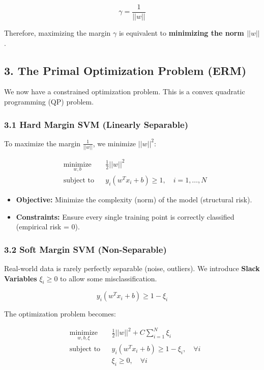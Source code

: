 \documentclass[
  italian,
  11pt,
]{article}
\begin{document}
\[\gamma = \frac{1}{||w||}\]

Therefore, maximizing the margin \(\gamma\) is equivalent to
\textbf{minimizing the norm \(||w||\)}.

\subsection{3. The Primal Optimization Problem
(ERM)}\label{the-primal-optimization-problem-erm}

We now have a constrained optimization problem. This is a convex
quadratic programming (QP) problem.

\subsubsection{3.1 Hard Margin SVM (Linearly
Separable)}\label{hard-margin-svm-linearly-separable}

To maximize the margin \(\frac{1}{||w||}\), we minimize \(||w||^2\):

\[\begin{aligned} & \underset{w, b}{\text{minimize}} & & \frac{1}{2} ||w||^2 \\ & \text{subject to} & & y_i (w^T x_i + b) \geq 1, \quad i = 1, \dots, N \end{aligned}\]

\begin{itemize}
\item
  \textbf{Objective:} Minimize the complexity (norm) of the model
  (structural risk).
\item
  \textbf{Constraints:} Ensure every single training point is correctly
  classified (empirical risk = 0).
\end{itemize}

\subsubsection{3.2 Soft Margin SVM
(Non-Separable)}\label{soft-margin-svm-non-separable}

Real-world data is rarely perfectly separable (noise, outliers). We
introduce \textbf{Slack Variables} \(\xi_i \geq 0\) to allow some
misclassification.

\[y_i (w^T x_i + b) \geq 1 - \xi_i\]

The optimization problem becomes:

\[\begin{aligned} & \underset{w, b, \xi}{\text{minimize}} & & \frac{1}{2} ||w||^2 + C \sum_{i=1}^N \xi_i \\ & \text{subject to} & & y_i (w^T x_i + b) \geq 1 - \xi_i, \quad \forall i \\ & & & \xi_i \geq 0, \quad \forall i \end{aligned}\]
\end{document}
